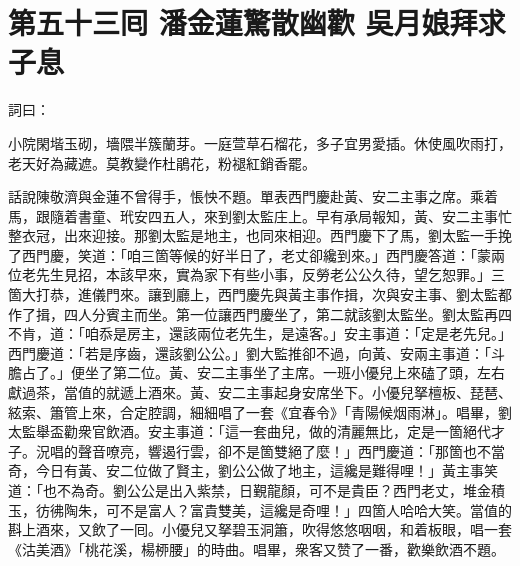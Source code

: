 
\chapter*{第五十三囘 潘金蓮驚散幽歡 吳月娘拜求子息}


詞曰：

\begin{myquote}
小院閑堦玉砌，墻隈半簇蘭芽。一庭萱草石榴花，多子宜男愛插。休使風吹雨打，老天好為藏遮。莫教變作杜鵑花，粉褪紅銷香罷。

\end{myquote}

話說陳敬濟與金蓮不曾得手，悵怏不題。單表西門慶赴黃、安二主事之席。乘着馬，跟隨着書童、玳安四五人，來到劉太監庄上。早有承局報知，黃、安二主事忙整衣冠，出來迎接。那劉太監是地主，也同來相迎。西門慶下了馬，劉太監一手挽了西門慶，笑道：「咱三箇等候的好半日了，老丈卻纔到來。」西門慶答道：「蒙兩位老先生見招，本該早來，實為家下有些小事，反勞老公公久待，望乞恕罪。」三箇大打恭，進儀門來。讓到廳上，西門慶先與黃主事作揖，次與安主事、劉太監都作了揖，四人分賓主而坐。第一位讓西門慶坐了，第二就該劉太監坐。劉太監再四不肯，道：「咱忝是房主，還該兩位老先生，是遠客。」安主事道：「定是老先兒。」西門慶道：「若是序齒，還該劉公公。」劉大監推卻不過，向黃、安兩主事道：「斗膽占了。」便坐了第二位。黃、安二主事坐了主席。一班小優兒上來磕了頭，左右獻過茶，當值的就遞上酒來。黃、安二主事起身安席坐下。小優兒拏檀板、琵琶、絃索、簫管上來，合定腔調，細細唱了一套《宜春令》「青陽候烟雨淋」。唱畢，劉太監舉盃勸衆官飲酒。安主事道：「這一套曲兒，做的清麗無比，定是一箇絕代才子。況唱的聲音嘹亮，響遏行雲，卻不是箇雙絕了麼！」西門慶道：「那箇也不當奇，今日有黃、安二位做了賢主，劉公公做了地主，這纔是難得哩！」黃主事笑道：「也不為奇。劉公公是出入紫禁，日覲龍顏，可不是貴臣？西門老丈，堆金積玉，彷彿陶朱，可不是富人？富貴雙美，這纔是奇哩！」{}四箇人哈哈大笑。當值的斟上酒來，又飲了一囘。小優兒又拏碧玉洞簫，吹得悠悠咽咽，和着板眼，唱一套《沽美酒》「桃花溪，楊桺腰」的時曲。唱畢，衆客又赞了一番，歡樂飲酒不題。

